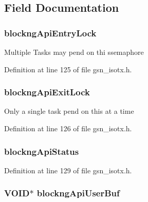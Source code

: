 \subsection{Field Documentation}
\hypertarget{a00102_a1375db10dcc5c2669543b8bdea7c9294}{
\subsubsection[{blockngApiEntryLock}]{ {\bf blockngApiEntryLock}}}
\label{a00102_a1375db10dcc5c2669543b8bdea7c9294}
Multiple Tasks may pend on thi ssemaphore 

Definition at line 125 of file gsn\_\-isotx.h.

\hypertarget{a00102_ad31b28c2c1d66a49676adefa0939184e}{
\subsubsection[{blockngApiExitLock}]{ {\bf blockngApiExitLock}}}
\label{a00102_ad31b28c2c1d66a49676adefa0939184e}
Only a single task pend on this at a time 

Definition at line 126 of file gsn\_\-isotx.h.

\hypertarget{a00102_a9058d044509dc3901de07c426d816472}{
\subsubsection[{blockngApiStatus}]{ {\bf blockngApiStatus}}}
\label{a00102_a9058d044509dc3901de07c426d816472}


Definition at line 129 of file gsn\_\-isotx.h.

\hypertarget{a00102_a578079528c6283b8779beb3a12945bf9}{
\subsubsection[{blockngApiUserBuf}]{\setlength{\rightskip}{0pt plus 5cm}VOID$\ast$ {\bf blockngApiUserBuf}}}
\label{a00102_a578079528c6283b8779beb3a12945bf9}


